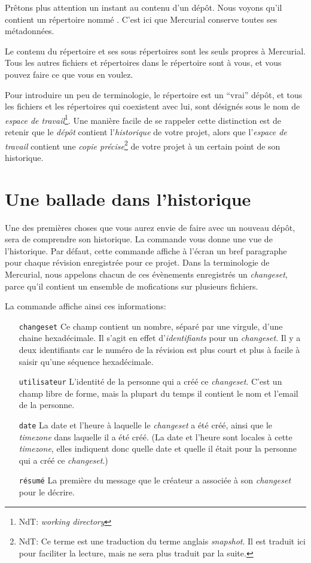 Prêtons plus attention un instant au contenu d'un dépôt. Nous voyons 
qu'il contient un répertoire nommé . C'est ici que Mercurial
conserve toutes ses métadonnées.

Le contenu du répertoire  et ses sous répertoires sont les
seuls propres à Mercurial. Tous les autres fichiers et répertoires dans 
le répertoire sont à vous, et vous pouvez faire ce que vous en voulez.

Pour introduire un peu de terminologie, le répertoire  est
un ``vrai'' dépôt, et tous les fichiers et les répertoires qui coexistent
avec lui, sont désignés sous le nom de \emph{espace de travail}\footnote{NdT: 
\textit{working directory}}. Une manière facile de se rappeler cette 
distinction est de retenir que le \emph{dépôt} contient l'\emph{historique}
de votre projet, alors que l'\emph{espace de travail} contient une \emph{copie
précise}\footnote{NdT: Ce terme est une traduction du terme anglais 
\textit{snapshot}. Il est traduit ici pour faciliter la lecture, mais ne sera
plus traduit par la suite.} de votre projet à un certain point de son
historique.

\section{Une ballade dans l'historique}

Une des premières choses que vous aurez envie de faire avec un nouveau
dépôt, sera de comprendre son historique. La commande  vous
donne une vue de l'historique.
Par défaut, cette commande affiche à l'écran un bref paragraphe pour chaque
révision enregistrée pour ce projet. Dans la terminologie de Mercurial, nous
appelons chacun de ces évènements enregistrés un \emph{changeset}, parce 
qu'il contient un ensemble de mofications sur plusieurs fichiers.

La commande  affiche ainsi ces informations:
\begin{itemize}
\item[\texttt{changeset}] Ce champ contient un nombre, séparé par une 
  virgule, d'une chaine hexadécimale. Il s'agit en effet d'\emph{identifiants}
  pour un \textit{changeset}. Il y a deux identifiants car le numéro de
  la révision est plus court et plus à facile à saisir qu'une séquence
  hexadécimale.
\item[\texttt{utilisateur}] L'identité de la personne qui a créé ce 
  \textit{changeset}. C'est un champ libre de forme, mais la plupart du
  temps il contient le nom et l'email de la personne.
\item[\texttt{date}] La date et l'heure à laquelle le \textit{changeset}
  a été créé, ainsi que le \textit{timezone} dans laquelle il a été créé. %
  (La date et l'heure sont locales à cette \textit{timezone}, elles indiquent
  donc quelle date et quelle il était pour la personne qui a créé ce %
  \textit{changeset}.)
\item[\texttt{résumé}] La première du message que le créateur a associée à
  son \textit{changeset} pour le décrire.
\end{itemize}

